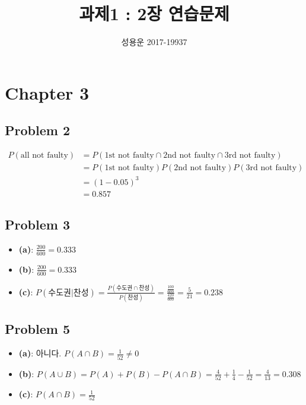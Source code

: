 \documentclass{article}
\title{과제1 : 2장 연습문제}
\author{성용운 2017-19937}
\date{}
\begin{document}
\maketitle

\section*{Chapter 3}

\subsection*{Problem 2}

\begin{align*}
	P(\textrm{all not faulty})
	&= P(\textrm{1st not faulty} \cap \textrm{2nd not faulty} \cap \textrm{3rd not faulty}) \\
	&= P(\textrm{1st not faulty}) P(\textrm{2nd not faulty}) P(\textrm{3rd not faulty}) \\
	&= (1-0.05)^3 \\
	&= 0.857
\end{align*}

\subsection*{Problem 3}

\begin{itemize}
	\item \textbf{(a)}: $\frac{200}{600} = 0.333$
	\item \textbf{(b)}: $\frac{200}{600} = 0.333$
	\item \textbf{(c)}: $P(\text{수도권}|\text{찬성}) = \frac{P(\text{수도권} \cap \text{찬성})}{P(\text{찬성})} = \frac{\frac{100}{600}}{\frac{420}{600}} = \frac{5}{21} = 0.238$
\end{itemize}

\subsection*{Problem 5}

\begin{itemize}
	\item \textbf{(a)}: 아니다. $P(A \cap B) = \frac{1}{52} \neq 0$
	\item \textbf{(b)}: $P(A \cup B) = P(A) + P(B) - P(A \cap B) = \frac{4}{52} + \frac{1}{4} - \frac{1}{52} = \frac{4}{13} = 0.308$
	\item \textbf{(c)}: $P(A \cap B) = \frac{1}{52}$
\end{itemize}
\end{document}
